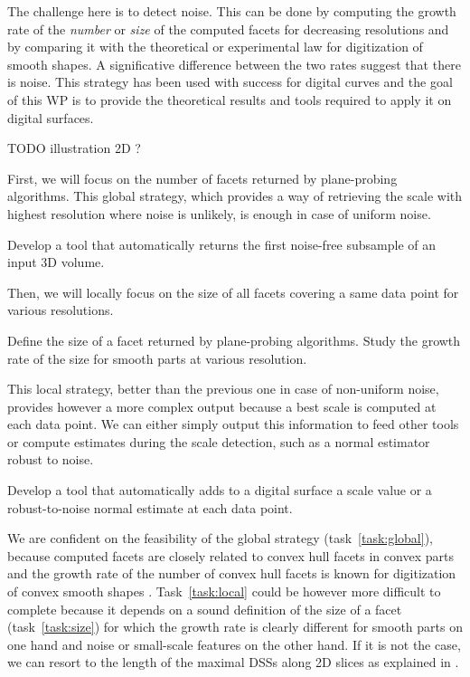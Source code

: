 The challenge here is to detect noise. This can be done by computing the growth rate of the
\emph{number} or \emph{size} of the computed facets for decreasing resolutions
and by comparing it with the theoretical or experimental law for digitization of smooth shapes.
A significative difference between the two rates suggest that there is noise.
This strategy has been used with success for digital curves \cite{Kerautret2012}
and the goal of this WP is to provide the theoretical results and tools required to apply it on digital surfaces. 

TODO illustration 2D ?

First, we will focus on the number of facets returned by plane-probing algorithms.
This global strategy, which provides a way of retrieving the scale with highest resolution
where noise is unlikely, is enough in case of uniform noise. 

\begin{Task}
  \label{task:global}
  Develop a tool that automatically returns the first noise-free subsample of an input 3D volume.
\end{Task}

Then, we will locally focus on the size of all facets covering a same data point for various resolutions. 

\begin{Task}
  \label{task:size}
  Define the size of a facet returned by plane-probing algorithms. Study the growth rate of the size
  for smooth parts at various resolution. 
\end{Task}

This local strategy, better than the previous one in case of non-uniform noise, provides however
a more complex output because a best scale is computed at each data point.
We can either simply output this information to feed other tools
or compute estimates during the scale detection, such as a normal estimator robust to noise.  

\begin{Task}
  \label{task:local}
  Develop a tool that automatically adds to a digital surface a scale value or
  a robust-to-noise normal estimate at each data point. 
\end{Task}

\Risks
We are confident on the feasibility of the global strategy (task~\ref{task:global}),
because computed facets are closely related to convex hull facets in convex parts
and the growth rate of the number of convex hull facets is known for digitization
of convex smooth shapes \cite{Barany1998}. 
Task~\ref{task:local} could be however more difficult to complete
because it depends on a sound definition of the size of a facet (task~\ref{task:size})
for which the growth rate is clearly different for smooth parts on one hand
and noise or small-scale features on the other hand. If it is not the case, we can
resort to the length of the maximal DSSs along 2D slices as explained in .

